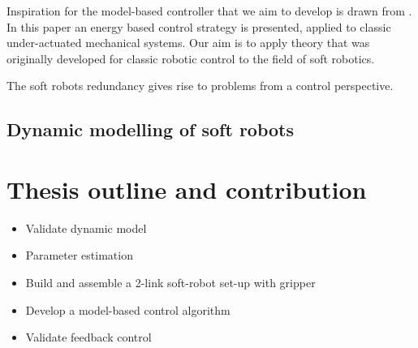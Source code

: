 Inspiration for the model-based controller that we aim to develop is drawn from \cite{spong1996energy}. In this paper an energy based control strategy is presented, applied to classic under-actuated mechanical systems. Our aim is to apply theory that was originally developed for classic robotic control to the field of soft robotics.

The soft robots redundancy gives rise to problems from a control perspective. 

\subsection{Dynamic modelling of soft robots}



\section{Thesis outline and contribution}




\begin{itemize}
    \item Validate dynamic model
    \item Parameter estimation
    \item Build and assemble a 2-link soft-robot set-up with gripper
    \item Develop a model-based control algorithm
    \item Validate feedback control
\end{itemize}